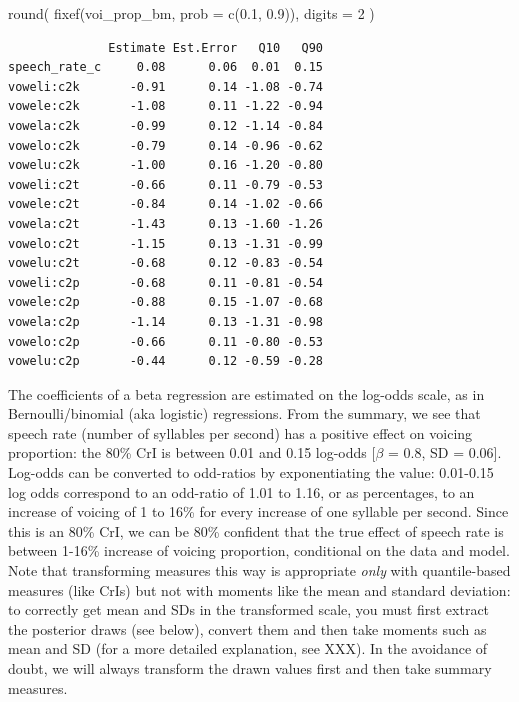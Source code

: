 \documentclass[
  authoryear,
  preprint,
  3p]{elsarticle}
\newenvironment{Shaded}{\begin{snugshade}}{\end{snugshade}}
\newcommand{\AttributeTok}[1]{\textcolor[rgb]{0.40,0.45,0.13}{#1}}
\newcommand{\DecValTok}[1]{\textcolor[rgb]{0.68,0.00,0.00}{#1}}
\newcommand{\FloatTok}[1]{\textcolor[rgb]{0.68,0.00,0.00}{#1}}
\newcommand{\FunctionTok}[1]{\textcolor[rgb]{0.28,0.35,0.67}{#1}}
\newcommand{\NormalTok}[1]{\textcolor[rgb]{0.00,0.23,0.31}{#1}}
\begin{document}
\begin{Shaded}
\begin{Highlighting}[]
\FunctionTok{round}\NormalTok{(}
  \FunctionTok{fixef}\NormalTok{(voi\_prop\_bm, }\AttributeTok{prob =} \FunctionTok{c}\NormalTok{(}\FloatTok{0.1}\NormalTok{, }\FloatTok{0.9}\NormalTok{)),}
  \AttributeTok{digits =} \DecValTok{2}
\NormalTok{)}
\end{Highlighting}
\end{Shaded}

\begin{verbatim}
              Estimate Est.Error   Q10   Q90
speech_rate_c     0.08      0.06  0.01  0.15
voweli:c2k       -0.91      0.14 -1.08 -0.74
vowele:c2k       -1.08      0.11 -1.22 -0.94
vowela:c2k       -0.99      0.12 -1.14 -0.84
vowelo:c2k       -0.79      0.14 -0.96 -0.62
vowelu:c2k       -1.00      0.16 -1.20 -0.80
voweli:c2t       -0.66      0.11 -0.79 -0.53
vowele:c2t       -0.84      0.14 -1.02 -0.66
vowela:c2t       -1.43      0.13 -1.60 -1.26
vowelo:c2t       -1.15      0.13 -1.31 -0.99
vowelu:c2t       -0.68      0.12 -0.83 -0.54
voweli:c2p       -0.68      0.11 -0.81 -0.54
vowele:c2p       -0.88      0.15 -1.07 -0.68
vowela:c2p       -1.14      0.13 -1.31 -0.98
vowelo:c2p       -0.66      0.11 -0.80 -0.53
vowelu:c2p       -0.44      0.12 -0.59 -0.28
\end{verbatim}

The coefficients of a beta regression are estimated on the log-odds
scale, as in Bernoulli/binomial (aka logistic) regressions. From the
summary, we see that speech rate (number of syllables per second) has a
positive effect on voicing proportion: the 80\% CrI is between 0.01 and
0.15 log-odds {[}\(\beta\) = 0.8, SD = 0.06{]}. Log-odds can be
converted to odd-ratios by exponentiating the value: 0.01-0.15 log odds
correspond to an odd-ratio of 1.01 to 1.16, or as percentages, to an
increase of voicing of 1 to 16\% for every increase of one syllable per
second. Since this is an 80\% CrI, we can be 80\% confident that the
true effect of speech rate is between 1-16\% increase of voicing
proportion, conditional on the data and model. Note that transforming
measures this way is appropriate \emph{only} with quantile-based
measures (like CrIs) but not with moments like the mean and standard
deviation: to correctly get mean and SDs in the transformed scale, you
must first extract the posterior draws (see below), convert them and
then take moments such as mean and SD (for a more detailed explanation,
see XXX). In the avoidance of doubt, we will always transform the drawn
values first and then take summary measures.
\end{document}
